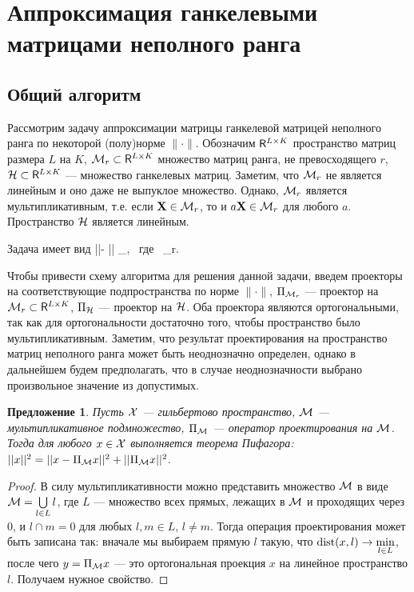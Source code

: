 \documentclass[12pt,a4paper,fleqn,leqno]{article}
\newtheorem{proposition}{Предложение}%
\begin{document}
\section{Аппроксимация ганкелевыми матрицами неполного ранга}
\label{sec:lowrank_appr}
\subsection{Общий алгоритм}
Рассмотрим задачу аппроксимации матрицы ганкелевой матрицей неполного ранга по некоторой (полу)норме $\|\cdot\|$.
Обозначим $\mathsf{R}^{L\times K}$ пространство матриц размера $L$ на $K$, $\mathcal{M}_r\subset \mathsf{R}^{L\times K}$ множество матриц ранга, не превосходящего $r$,
$\mathcal{H} \subset \mathsf{R}^{L\times K}$ --- множество ганкелевых матриц.
Заметим, что  $\mathcal{M}_r$ не является линейным и оно даже не выпуклое множество. Однако, $\mathcal{M}_r$ является мультипликативным, т.е.
если $\mathbf{X}\in \mathcal{M}_r$, то и $a\mathbf{X}\in \mathcal{M}_r$ для любого $a$.
Пространство $\mathcal{H}$ является линейным.

Задача имеет вид
\be
\label{eq:gen_task}
||\bfX - \bfY|| \to \min_\bfY, \mbox{\ где\ } \bfY \in \calH \cap \calM_r.
\ee

Чтобы привести схему алгоритма для решения данной задачи, введем проекторы на соответствующие подпространства
по норме $\|\cdot\|$, $\Pi_{\mathcal{M}_r}$ --- проектор на $\mathcal{M}_r\subset \mathsf{R}^{L\times K}$,
$\Pi_{\mathcal{H}}$ --- проектор на $\mathcal{H}$. 
Оба проектора являются ортогональными,
так как для ортогональности достаточно того, чтобы пространство было мультипликативным. Заметим, что результат проектирования
на пространство матриц неполного ранга может быть неоднозначно определен, однако в дальнейшем будем предполагать, что
в случае неоднозначности выбрано произвольное значение из допустимых.

\begin{proposition} \label{pythaprop}
Пусть $\mathcal{X}$ --- гильбертово пространство, $\mathcal{M}$ --- мультипликативное подмножество, $\Pi_{\mathcal{M}}$ --- оператор проектирования на $\mathcal{M}$. Тогда для любого $x \in \mathcal{X}$ выполняется теорема Пифагора: $||x||^2 = ||x - \Pi_{\mathcal{M}} x||^2 + ||\Pi_{\mathcal{M}} x||^2$.
\end{proposition}
\begin{proof}
В силу мультипликативности можно представить множество $\mathcal{M}$ в виде $\mathcal{M} = \bigcup\limits_{l \in L}l$, где $L$ --- множество всех прямых, лежащих в $\mathcal{M}$ и проходящих через $0$, и $l \cap m = 0$ для любых $l, m \in L$, $l \neq m$. Тогда операция проектирования может быть записана так: вначале мы выбираем прямую $l$ такую, что $\mathop{\mathrm{dist}}(x, l) \rightarrow \min\limits_{l \in L}$, после чего $y = \Pi_{\mathcal{M}} x$ --- это ортогональная проекция $x$ на линейное пространство $l$. Получаем нужное свойство.
\end{proof}
\end{document}
